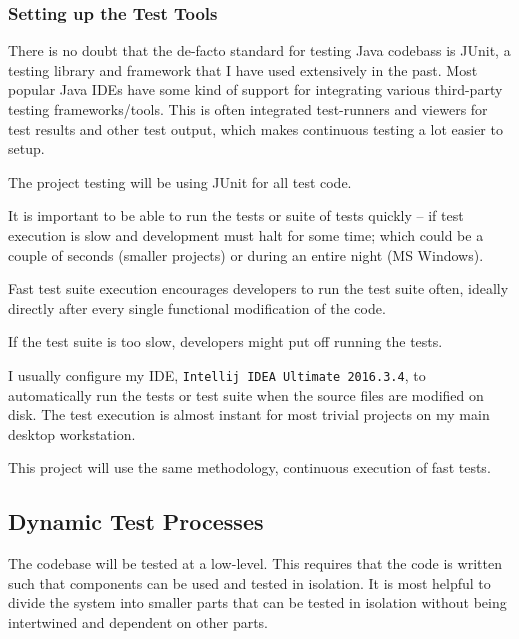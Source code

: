 %
%

\subsubsection{Setting up the Test Tools}
There is no doubt that the de-facto standard for testing Java codebass is
JUnit\cite{tools:junit}, a testing library and framework that I have used
extensively in the past.
Most popular Java IDEs have some kind of support for integrating various
third-party testing frameworks/tools. 
This is often integrated test-runners and viewers for test results and other
test output, which makes continuous testing a lot easier to setup.

The project testing will be using JUnit for all test code. 

It is important to be able to run the tests or suite of tests quickly -- if
test execution is slow and development must halt for some time; which could be
a couple of seconds (smaller projects) or during an entire night (MS Windows).

Fast test suite execution encourages developers to run the test suite often,
ideally directly after every single functional modification of the code.

If the test suite is too slow, developers might put off running the tests.

I usually configure my IDE, \texttt{Intellij IDEA Ultimate 2016.3.4}, to
automatically run the tests or test suite when the source files are modified on
disk. The test execution is almost instant for most trivial projects on my main
desktop workstation.

This project will use the same methodology, continuous execution of fast tests.

\subsection{Dynamic Test Processes}
The codebase will be tested at a low-level. This requires that the code is
written such that components can be used and tested in isolation.
It is most helpful to divide the system into smaller parts that can be tested
in isolation without being intertwined and dependent on other parts.

